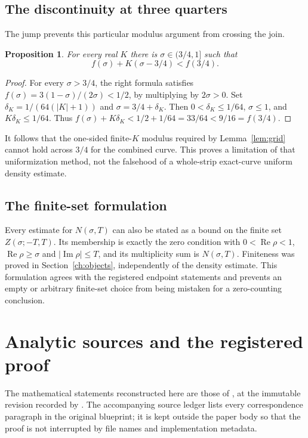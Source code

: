 \documentclass[11pt,a4paper,oneside]{article}
\newtheorem{proposition}[theorem]{Proposition}
\theoremstyle{definition}
\newcommand{\Rea}{\operatorname{Re}}
\newcommand{\Ima}{\operatorname{Im}}
\numberwithin{equation}{section}
\begin{document}
\subsection{The discontinuity at three quarters}
The jump prevents this particular modulus argument from crossing the join.
\begin{proposition}
For every real $K$ there is $\sigma\in(3/4,1]$ such that
\[
 f(\sigma)+K(\sigma-3/4)<f(3/4).
\]
\end{proposition}
\begin{proof}
For every $\sigma>3/4$, the right formula satisfies
$f(\sigma)=3(1-\sigma)/(2\sigma)<1/2$, by multiplying by $2\sigma>0$.
Set $\delta_K=1/(64(|K|+1))$ and $\sigma=3/4+\delta_K$.
Then $0<\delta_K\le1/64$, $\sigma\le1$, and $K\delta_K\le1/64$.
Thus $f(\sigma)+K\delta_K<1/2+1/64=33/64<9/16=f(3/4)$.
\end{proof}
It follows that the one-sided finite-$K$ modulus required by
Lemma~\ref{lem:grid} cannot hold across $3/4$ for the combined curve.
This proves a limitation of that uniformization method, not the falsehood
of a whole-strip exact-curve uniform density estimate.

\subsection{The finite-set formulation}
Every estimate for $N(\sigma,T)$ can also be stated as a bound on the finite set $Z(\sigma;-T,T)$. Its membership is exactly the zero condition with $0<\Rea\rho<1$, $\Rea\rho\ge\sigma$ and $|\Ima\rho|\le T$, and its multiplicity sum is $N(\sigma,T)$. Finiteness was proved in Section~\ref{ch:objects}, independently of the density estimate. This formulation agrees with the registered endpoint statements and prevents an empty or arbitrary finite-set choice from being mistaken for a zero-counting conclusion.

\appendix
\section{Analytic sources and the registered proof}\label{app:sources}
The mathematical statements reconstructed here are those of \cite{Lewko}, at the immutable revision recorded by \cite{Palomar}. The accompanying source ledger lists every correspondence paragraph in the original blueprint; it is kept outside the paper body so that the proof is not interrupted by file names and implementation metadata.
\end{document}
